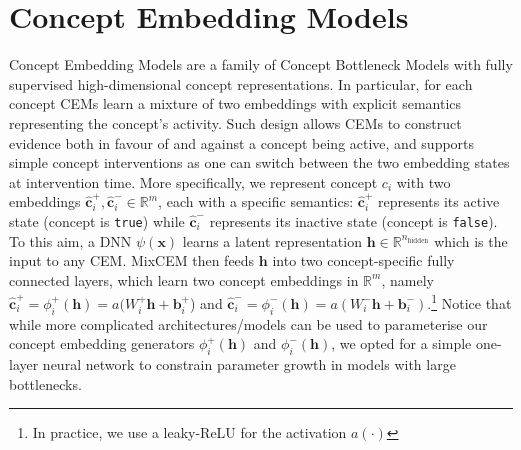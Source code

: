 \documentclass[withindex,glossary]{cam-thesis}
\theoremstyle{plain}
\theoremstyle{definition}
\theoremstyle{remark}
\begin{document}
\section{Concept Embedding Models} \label{sec:cem}
Concept Embedding Models are a family of Concept Bottleneck Models with fully supervised high-dimensional concept representations. In particular, for each concept CEMs learn a mixture of two embeddings with explicit semantics representing the concept's activity. Such design allows CEMs to construct evidence both in favour of and against a concept being active, and supports simple concept interventions as one can switch between the two embedding states at intervention time.
%
%
More specifically, we represent concept $c_i$ with two embeddings $\hat{\textbf{c}}^+_i, \hat{\textbf{c}}^-_i \in \mathbb{R}^m$, each with a specific semantics: $\hat{\textbf{c}}^+_i$ represents its active state (concept is \texttt{true}) while $\hat{\textbf{c}}^-_i$ represents its inactive state (concept is \texttt{false}). To this aim, a DNN $\psi(\mathbf{x})$ learns a latent representation $\mathbf{h} \in \mathbb{R}^{n_\text{hidden}}$ which is the input to any CEM. 
MixCEM then feeds $\mathbf{h}$ into two concept-specific fully connected layers, which learn two concept embeddings in $\mathbb{R}^m$, namely $\hat{\mathbf{c}}^+_i = \phi^+_i(\mathbf{h}) = a(W^+_i\mathbf{h} + \mathbf{b}^+_i$) and $\hat{\mathbf{c}}^-_i = \phi^-_i(\mathbf{h}) = a(W^-_i\mathbf{h} + \mathbf{b}^-_i)$.\footnote{In practice, we use a leaky-ReLU for the activation $a(\cdot)$} Notice that while more complicated architectures/models can be used to parameterise our concept embedding generators $\phi^+_i(\mathbf{h})$ and $\phi^-_i(\mathbf{h})$, we opted for a simple one-layer neural network to constrain parameter growth in models with large bottlenecks.
\end{document}
